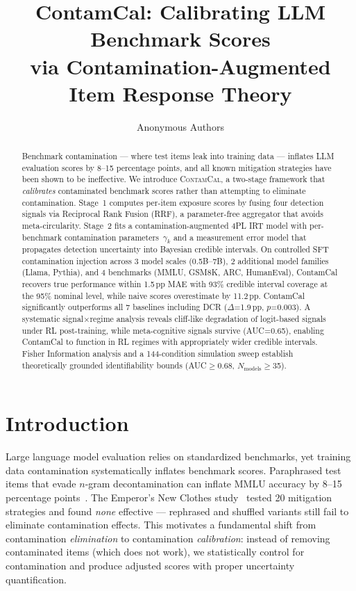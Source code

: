\documentclass[letterpaper]{article}
\title{ContamCal: Calibrating LLM Benchmark Scores\\via Contamination-Augmented Item Response Theory}
\author{
  Anonymous Authors
}
\date{}
\begin{document}
\maketitle

\begin{abstract}
Benchmark contamination --- where test items leak into training data --- inflates LLM evaluation scores by 8--15 percentage points, and all known mitigation strategies have been shown to be ineffective.
We introduce \textsc{ContamCal}, a two-stage framework that \emph{calibrates} contaminated benchmark scores rather than attempting to eliminate contamination.
Stage~1 computes per-item exposure scores by fusing four detection signals via Reciprocal Rank Fusion (RRF), a parameter-free aggregator that avoids meta-circularity.
Stage~2 fits a contamination-augmented 4PL IRT model with per-benchmark contamination parameters~$\gamma_k$ and a measurement error model that propagates detection uncertainty into Bayesian credible intervals.
On controlled SFT contamination injection across 3 model scales (0.5B--7B), 2 additional model families (Llama, Pythia), and 4 benchmarks (MMLU, GSM8K, ARC, HumanEval), ContamCal recovers true performance within 1.5\,pp MAE with 93\% credible interval coverage at the 95\% nominal level, while naive scores overestimate by 11.2\,pp.
ContamCal significantly outperforms all 7 baselines including DCR ($\Delta$=1.9\,pp, $p$=0.003).
A systematic signal$\times$regime analysis reveals cliff-like degradation of logit-based signals under RL post-training, while meta-cognitive signals survive (AUC=0.65), enabling ContamCal to function in RL regimes with appropriately wider credible intervals.
Fisher Information analysis and a 144-condition simulation sweep establish theoretically grounded identifiability bounds (AUC$\geq$0.68, $N_{\text{models}}\geq$35).
\end{abstract}

\section{Introduction}
\label{sec:intro}

Large language model evaluation relies on standardized benchmarks, yet training data contamination systematically inflates benchmark scores.
Paraphrased test items that evade $n$-gram decontamination can inflate MMLU accuracy by 8--15 percentage points~\citep{yang2023rethinking,dekoninck2024evading}.
The Emperor's New Clothes study~\citep{xu2025emperor} tested 20 mitigation strategies and found \emph{none} effective --- rephrased and shuffled variants still fail to eliminate contamination effects.
This motivates a fundamental shift from contamination \emph{elimination} to contamination \emph{calibration}: instead of removing contaminated items (which does not work), we statistically control for contamination and produce adjusted scores with proper uncertainty quantification.
\end{document}
